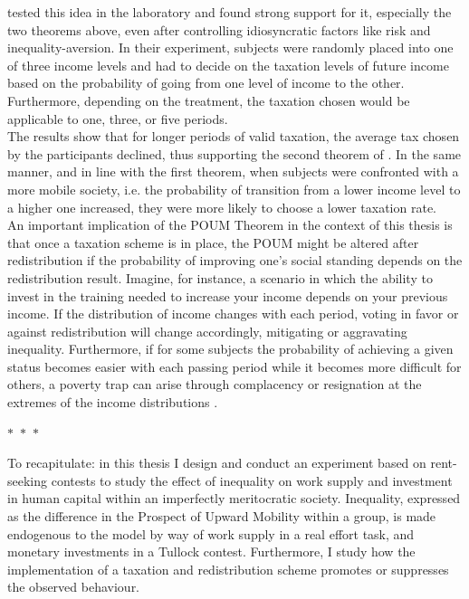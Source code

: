 \cite{checchi2003} tested this idea in the laboratory and found strong support for it, especially the two theorems above, even after controlling idiosyncratic factors like risk and inequality-aversion. In their experiment, subjects were randomly placed into one of three income levels and had to decide on the taxation levels of future income based on the probability of going from one level of income to the other. Furthermore, depending on the treatment, the taxation chosen would be applicable to one, three, or five periods.\\

The results show that for longer periods of valid taxation, the average tax chosen by the participants declined, thus supporting the second theorem of \citeauthor{benabou2001}. In the same manner, and in line with the first theorem, when subjects were confronted with a more mobile society, i.e. the probability of transition from a lower income level to a higher one increased, they were more likely to choose a lower taxation rate.\\

An important implication of the POUM Theorem in the context of this thesis is that once a taxation scheme is in place, the POUM might be altered after redistribution if the probability of improving one's social standing depends on the redistribution result. Imagine, for instance, a scenario in which the ability to invest in the training needed to increase your income depends on your previous income. If the distribution of income changes with each period, voting in favor or against redistribution will change accordingly, mitigating or aggravating inequality. Furthermore, if for some subjects the probability of achieving a given status becomes easier with each passing period while it becomes more difficult for others, a poverty trap can arise through complacency or resignation at the extremes of the income distributions \citep{ceroni2001, ku2012}.

\begin{center}
  $\ast$~$\ast$~$\ast$
\end{center}

To recapitulate: in this thesis I design and conduct an experiment based on rent-seeking contests to study the effect of inequality on work supply and investment in human capital within an imperfectly meritocratic society. Inequality, expressed as the difference in the Prospect of Upward Mobility within a group, is made endogenous to the model by way of work supply in a real effort task, and monetary investments in a Tullock contest.  Furthermore, I study how the implementation of a taxation and redistribution scheme promotes or suppresses the observed behaviour.\\

